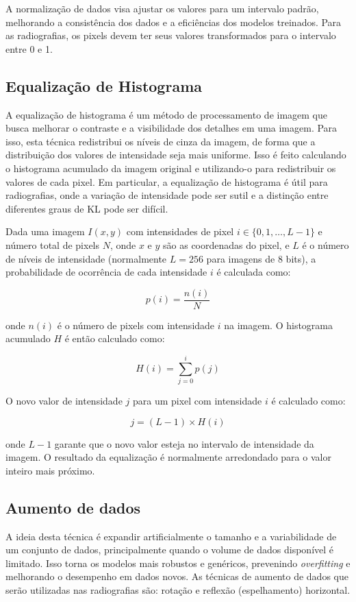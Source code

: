 A normalização de dados visa ajustar os valores para um intervalo padrão, melhorando a consistência dos dados e a eficiências dos modelos treinados. Para as radiografias, os pixels devem ter seus valores transformados para o intervalo entre 0 e 1.

\subsection{Equalização de Histograma}

A equalização de histograma é um método de processamento de imagem que busca melhorar o contraste e a visibilidade dos detalhes em uma imagem. Para isso, esta técnica redistribui os níveis de cinza da imagem, de forma que a distribuição dos valores de intensidade seja mais uniforme. Isso é feito calculando o histograma acumulado da imagem original e utilizando-o para redistribuir os valores de cada pixel. Em particular, a equalização de histograma é útil para radiografias, onde a variação de intensidade pode ser sutil e a distinção entre diferentes graus de KL pode ser difícil.

Dada uma imagem \( I(x, y) \) com intensidades de pixel \( i \in \{0, 1, \dots, L-1\} \) e número total de pixels \( N \), onde \( x \) e \( y \) são as coordenadas do pixel, e \( L \) é o número de níveis de intensidade (normalmente \( L = 256 \) para imagens de 8 bits), a probabilidade de ocorrência de cada intensidade \( i \) é calculada como:

\[
p(i) = \frac{n(i)}{N}
\]

onde \( n(i) \) é o número de pixels com intensidade \( i \) na imagem. O histograma acumulado \( H \) é então calculado como:

\[
H(i) = \sum_{j=0}^{i} p(j)
\]

O novo valor de intensidade \( j \) para um pixel com intensidade \( i \) é calculado como:

\[
j = (L-1) \times H(i)
\]

onde \( L - 1 \) garante que o novo valor esteja no intervalo de intensidade da imagem. O resultado da equalização é normalmente arredondado para o valor inteiro mais próximo.

\subsection{Aumento de dados}

A ideia desta técnica é expandir artificialmente o tamanho e a variabilidade de um conjunto de dados, principalmente quando o volume de dados disponível é limitado. Isso torna os modelos mais robustos e genéricos, prevenindo \textit{overfitting} e melhorando o desempenho em dados novos. As técnicas de aumento de dados que serão utilizadas nas radiografias são: rotação e reflexão (espelhamento) horizontal.

